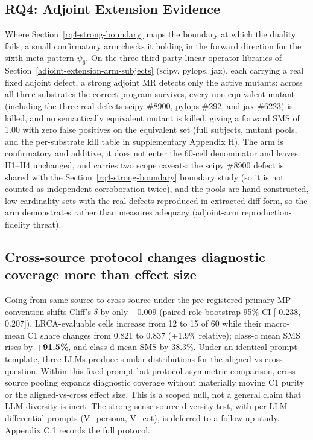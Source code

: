 \documentclass[manuscript,screen,review]{acmart}
\begin{document}
\subsection{RQ4: Adjoint Extension Evidence}\label{rq4-adjoint-extension-arm}

Where Section~\ref{rq4-strong-boundary} maps the boundary at which the duality fails, a small
confirmatory arm checks it holding in the forward direction for the sixth
meta-pattern $\psi_6$. On the three third-party linear-operator libraries
of Section~\ref{adjoint-extension-arm-subjects} (scipy, pylops, jax), each carrying a real fixed adjoint defect, a
strong adjoint MR detects only the active mutants: across all three
substrates the correct program survives, every non-equivalent mutant
(including the three real defects scipy \#8900, pylops \#292, and jax
\#6223) is killed, and no semantically equivalent mutant is killed, giving
a forward SMS of 1.00 with zero false positives on the equivalent set
(full subjects, mutant pools, and the per-substrate kill table in
supplementary Appendix H). The arm is confirmatory and additive, it
does not enter the 60-cell denominator and leaves H1--H4 unchanged, and
carries two scope caveats: the scipy \#8900 defect is shared with the Section~\ref{rq4-strong-boundary}
boundary study (so it is not counted as independent corroboration twice),
and the pools are hand-constructed, low-cardinality sets with the real
defects reproduced in extracted-diff form, so the arm demonstrates rather
than measures adequacy (adjoint-arm reproduction-fidelity threat).


\label{discussion}

\subsection{Cross-source protocol changes diagnostic coverage more than effect size}\label{cross-source-contributes-mutant-quality-not-effect-size}

Going from same-source to cross-source under the pre-registered
primary-MP convention shifts Cliff's $\delta$ by only $-$0.009 (paired-role
bootstrap 95\% CI {[}-0.238, 0.207{]}). LRCA-evaluable cells increase
from 12 to 15 of 60 while their macro-mean C1 share changes from 0.821
to 0.837 (+1.9\% relative); class-c mean SMS rises by \textbf{+91.5\%}, and
class-d mean SMS by 38.3\%. Under an identical prompt template, three
LLMs produce similar distributions for the aligned-vs-cross question.
Within this fixed-prompt but protocol-asymmetric comparison, cross-source
pooling expands diagnostic coverage without materially moving C1 purity
or the aligned-vs-cross effect size. This is a scoped null,
not a general claim that LLM diversity is inert. The strong-sense
source-diversity test, with per-LLM differential prompts (V\_persona,
V\_cot), is deferred to a follow-up study. Appendix C.1 records the full
protocol.
\end{document}
